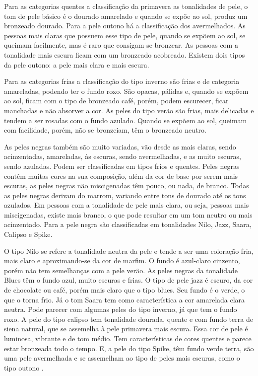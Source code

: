 Para as categorias quentes a classificação da primavera as tonalidades de pele, o tom de pele básico é o dourado amarelado e quando se expõe ao sol, produz um bronzeado dourado. Para a pele outono há a classificação dos avermelhados. As pessoas mais claras que possuem esse tipo de pele, quando se expõem ao sol, se queimam facilmente, mas é raro que consigam se bronzear. As pessoas com a tonalidade mais escura ficam com um bronzeado acobreado. Existem dois tipos da pele outono: a pele mais clara e mais escura. 

Para as categorias frias a classificação do tipo inverno são frias e de categoria amareladas, podendo ter o fundo roxo. São opacas, pálidas e, quando se expõem ao sol, ficam com o tipo de bronzeado café, porém, podem escurecer, ficar manchadas e não absorver a cor. As peles do tipo verão são frias, mais delicadas e tendem a ser rosadas com o fundo azulado. Quando se expõem ao sol, queimam com facilidade, porém, não se bronzeiam, têm o bronzeado neutro. 

As peles negras também são muito variadas, vão desde as mais claras, sendo acinzentadas, amareladas, às escuras, sendo avermelhadas, e as muito escuras, sendo azuladas. Podem ser classificadas em tipos frios e quentes. Peles negras contêm muitas cores na sua composição, além da cor de base por serem mais escuras, as peles negras não miscigenadas têm pouco, ou nada, de branco. Todas as peles negras derivam do marrom, variando entre tons de dourado até os tons azulados. Em pessoas com a tonalidade de pele mais clara, ou seja, pessoas mais miscigenadas, existe mais branco, o que pode resultar em um tom neutro ou mais acinzentado. Para a pele negra são classificadas em tonalidades Nilo, Jazz, Saara, Calipso e Spike.

O tipo Nilo se refere a tonalidade neutra da pele e tende a ser uma coloração fria, mais claro e aproximando-se da cor de marfim. O fundo é azul-claro cinzento, porém não tem semelhanças com a pele verão. As peles negras da tonalidade Blues têm o fundo azul, muito escuras e frias. O tipo de pele jazz é escuro, da cor de chocolate ou café, porém mais claro que o tipo blues. Seu fundo é o verde, o que o torna frio. Já o tom Saara tem como característica a cor amarelada clara neutra. Pode parecer com algumas peles do tipo inverno, já que tem o fundo roxo. A pele do tipo calipso tem tonalidade dourada, quente e com fundo terra de siena natural, que se assemelha à pele primavera mais escura. Essa cor de pele é luminosa, vibrante e de tom médio. Tem características de cores quentes e parece estar bronzeada todo o tempo. E, a pele do tipo Spike, têm fundo verde terra, são uma pele avermelhada e se assemelham ao tipo de peles mais escuras, como o tipo outono \cite{Visagismo}. 


